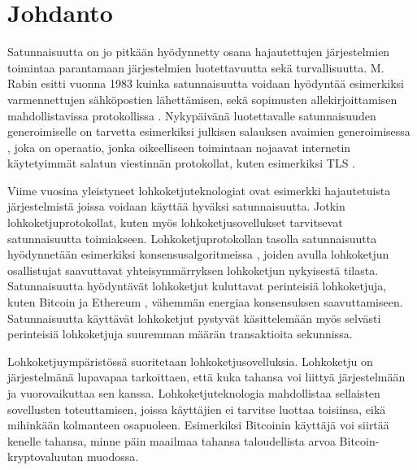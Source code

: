\chapter{Johdanto\label{intro}}

Satunnaisuutta on jo pitkään hyödynnetty osana hajautettujen järjestelmien toimintaa parantamaan järjestelmien luotettavuutta sekä turvallisuutta. M. Rabin esitti vuonna 1983 kuinka satunnaisuutta voidaan hyödyntää esimerkiksi varmennettujen sähköpostien lähettämisen, sekä sopimusten allekirjoittamisen mahdollistavissa protokollissa \cite{rabin_transaction_1983}. Nykypäivänä luotettavalle satunnaisuuden generoimiselle on tarvetta esimerkiksi julkisen salauksen avaimien generoimisessa \cite{corrigan-gibbs_ensuring_2014}, joka on operaatio, jonka oikeelliseen toimintaan nojaavat internetin käytetyimmät salatun viestinnän protokollat, kuten esimerkiksi TLS \cite{rfc8446}. 

Viime vuosina yleistyneet lohkoketjuteknologiat ovat esimerkki hajautetuista järjestelmistä joissa voidaan käyttää hyväksi satunnaisuutta. Jotkin lohkoketjuprotokollat, kuten myös lohkoketjusovellukset tarvitsevat satunnaisuutta toimiakseen. Lohkoketjuprotokollan tasolla satunnaisuutta hyödynnetään esimerkiksi  konsensusalgoritmeissa \cite{gilad_algorand_2017, hanke_dfinity_2018}, joiden avulla lohkoketjun osallistujat saavuttavat yhteisymmärryksen lohkoketjun nykyisestä tilasta. Satunnaisuutta hyödyntävät lohkoketjut kuluttavat perinteisiä lohkoketjuja, kuten Bitcoin \cite{noauthor_bitcoin_nodate} ja Ethereum \cite{noauthor_ethereum_nodate}, vähemmän energiaa konsensuksen saavuttamiseen. Satunnaisuutta käyttävät lohkoketjut pystyvät käsittelemään myös selvästi perinteisiä lohkoketjuja suuremman määrän transaktioita sekunnissa.

Lohkoketjuympäristössä suoritetaan lohkoketjusovelluksia. Lohkoketju on järjestelmänä lupavapaa tarkoittaen, että kuka tahansa voi liittyä järjestelmään ja vuorovaikuttaa sen kanssa. Lohkoketjuteknologia mahdollistaa sellaisten sovellusten toteuttamisen, joissa käyttäjien ei tarvitse luottaa toisiinsa, eikä mihinkään kolmanteen osapuoleen. Esimerkiksi Bitcoinin käyttäjä voi siirtää kenelle tahansa, minne päin maailmaa tahansa taloudellista arvoa Bitcoin-kryptovaluutan muodossa.

